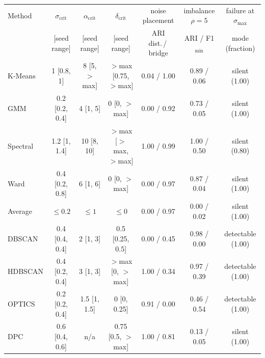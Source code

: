 \begin{tabular}{@{}lcccccc@{}}
\toprule
Method & $\sigma_{\text{crit}}$ & $\alpha_{\text{crit}}$ & $\delta_{\text{crit}}$ & noise placement & imbalance $\rho = 5$ & failure at $\sigma_{\max}$ \\
 & [seed range] & [seed range] & [seed range] & ARI dist.\,/\,bridge & ARI / F1$_{\min}$ & mode (fraction) \\
\midrule
K-Means & 1 [0.8, 1] & 8 [5, $>$max] & $>$max [0.75, $>$max] & 0.04 / 1.00 & 0.89 / 0.06 & silent (1.00) \\
GMM & 0.2 [0.2, 0.4] & 4 [1, 5] & 0 [0, $>$max] & 0.00 / 0.92 & 0.73 / 0.05 & silent (1.00) \\
Spectral & 1.2 [1, 1.4] & 10 [8, 10] & $>$max [$>$max, $>$max] & 1.00 / 0.99 & 1.00 / 0.50 & silent (0.80) \\
Ward & 0.4 [0.2, 0.8] & 6 [1, 6] & 0 [0, $>$max] & 0.00 / 0.97 & 0.87 / 0.04 & silent (1.00) \\
Average & $\le 0.2$ & $\le 1$ & $\le 0$ & 0.00 / 0.97 & 0.00 / 0.02 & silent (1.00) \\
DBSCAN & 0.4 [0.4, 0.4] & 2 [1, 3] & 0.5 [0.25, 0.5] & 0.00 / 0.45 & 0.98 / 0.00 & detectable (1.00) \\
HDBSCAN & 0.4 [0.2, 0.4] & 3 [1, 3] & $>$max [0, $>$max] & 1.00 / 0.34 & 0.97 / 0.39 & detectable (1.00) \\
OPTICS & 0.2 [0.2, 0.4] & 1.5 [1, 1.5] & 0 [0, 0.25] & 0.91 / 0.00 & 0.46 / 0.54 & detectable (1.00) \\
DPC & 0.6 [0.4, 0.6] & n/a & 0.75 [0.5, $>$max] & 1.00 / 0.81 & 0.13 / 0.05 & silent (1.00) \\
\bottomrule
\end{tabular}
